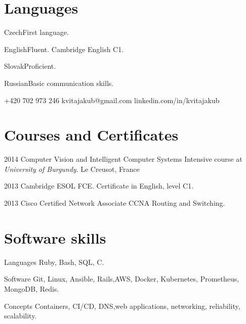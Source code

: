 \documentclass{tccv}
\begin{document}
\section{Languages}

\begin{factlist}
	\item{Czech}{First language.}
	\item{English}{Fluent. Cambridge English C1.}
	\item{Slovak}{Proficient.}
	\item{Russian}{Basic communication skills.}
\end{factlist}

{+420 702 973 246}
{kvitajakub@gmail.com}
{linkedin.com/in/kvitajakub}

\section{Courses and Certificates}

\begin{yearlist}
	
	\item{2014}
	{Computer Vision and Intelligent Computer Systems}
	{Intensive course at \emph{University of Burgundy}. Le Creusot, France}
	
	\item{2013}
	{Cambridge ESOL FCE.}
	{Certificate in English, level C1.}
	
	\item{2013}
	{Cisco Certified Network Associate}
	{CCNA Routing and Switching.}
	
\end{yearlist}

\section{Software skills}

\begin{factlist}
	
	\item{Languages}
	{Ruby, Bash, SQL, C.}
	
	\item{Software}
	{Git, Linux, Ansible, Rails,\newline AWS, Docker, Kubernetes, Prometheus, MongoDB, Redis.}
	
	\item{Concepts}
	{Containers, CI/CD, DNS,\newline web applications, networking, reliability, scalability.}
	
\end{factlist}
\end{document}
